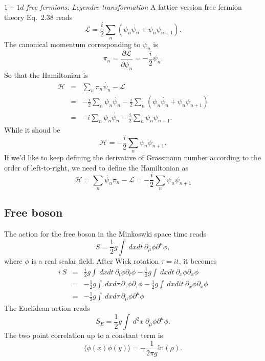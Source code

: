 \documentclass[submission, PhysLectNotes]{SciPost}
\begin{document}
{\it $1+1d$ free fermions: Legendre transformation}
A lattice version free fermion theory Eq.~$2.38$ reads
\begin{equation}
    \mathcal{L} = \frac{i}{2} \sum_n \left( \psi_n \dot{\psi_n} + \psi_n \psi_{n+1}\right).
\end{equation}
The canonical momentum corresponding to $\psi_n$ is 
\begin{equation}
    \pi_n = \frac{\partial \mathcal{L}}{\partial \dot{\psi_n}} = -\frac{i}{2}\psi_n.
\end{equation}
So that the Hamiltonian is 
\begin{eqnarray}
    \mathcal{H} &=& \sum_n \pi_n \dot{\psi_n} - \mathcal{L} \nonumber\\
      &=& -\frac{i}{2}\sum_n\psi_n \dot{\psi_n} - \frac{i}{2} \sum_n \left( \psi_n \dot{\psi_n} + \psi_n \psi_{n+1}\right) \\
      &=& -i \sum_n\psi_n \dot{\psi_n} - \frac{i}{2} \sum_n \psi_n \psi_{n+1} \nonumber.
\end{eqnarray}
While it shoud be 
\begin{equation}
    \mathcal{H} = -\frac{i}{2}\sum_n\psi_n \psi_{n+1}.
\end{equation}
If we'd like to keep defining the derivative of Grassmann number according to the order of left-to-right, we need to define the Hamiltonian as
\begin{equation}
    \mathcal{H} = \sum_n \dot{\psi_n} \pi_n - \mathcal{L} =  - \frac{i}{2} \sum_n \psi_n \psi_{n+1}
\end{equation}

\subsection{Free boson}
The action for the free boson in the Minkoswki space time reads
\begin{equation}
    S = \frac{1}{2}g\int \ dxdt \ \partial_\mu \phi \partial^\mu \phi,
\end{equation}
where $\phi$ is a real scalar field. After Wick rotation $\tau = it$, it becomes
\begin{eqnarray}
    i\ S &=& \frac{i}{2}g\int \ dxdt \ \partial_t \phi \partial_t \phi - \frac{i}{2}g\int \ dxdt \ \partial_x \phi \partial_x \phi \nonumber \\
    &=& -\frac{1}{2}g\int \ dxd\tau \ \partial_\tau \phi \partial_\tau \phi - \frac{1}{2}g\int \ dxdit \ \partial_x \phi \partial_x \phi \nonumber \\
    &=& -\frac{1}{2}g\int \ dxd\tau \ \partial_\mu \phi \partial^\mu \phi
\end{eqnarray}
The Euclidean action reads
\begin{equation}
    S_E = \frac{1}{2}g\int \ d^2x \ \partial_\mu \phi \partial^\mu \phi.
\end{equation}
The two point correlation up to a constant term is
\begin{equation}
    \langle \phi(x) \phi(y) \rangle = -\frac{1}{2\pi g} \mathrm{ln} (\rho).
\end{equation}
\end{document}
